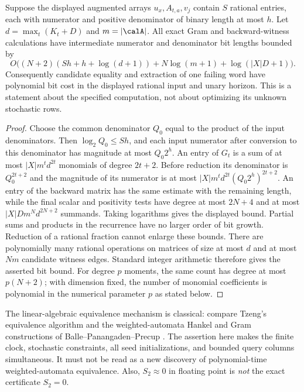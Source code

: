 \begin{lemma}\label{lem:grambits49}
Suppose the displayed augmented arrays $u_x,A_{t,a},v_j$ contain $S$
rational entries, each with numerator and positive denominator of
binary length at most $h$. Let $d=\max_t(K_t+D)$ and
$m=|\calA|$. All exact Gram and backward-witness calculations have
intermediate numerator and denominator bit lengths bounded by
\[
 O\bigl((N+2)(Sh+h+\log(d+1))+N\log(m+1)
           +\log(|X|D+1)\bigr).
\]
Consequently candidate equality and extraction of one failing word
have polynomial bit cost in the displayed rational input and unary
horizon. This is a statement about the specified computation, not
about optimizing its unknown stochastic rows.
\end{lemma}
\begin{proof}
Choose the common denominator $Q_0$ equal to the product of the input
denominators. Then $\log_2 Q_0\le Sh$, and each input numerator after
conversion to this denominator has magnitude at most $Q_0 2^h$.
An entry of $G_t$ is a sum of at most $|X|m^t d^{2t}$ monomials of
degree $2t+2$. Before reduction its denominator is $Q_0^{2t+2}$
and the magnitude of its numerator is at most
$|X|m^t d^{2t}(Q_0 2^h)^{2t+2}$.
An entry of the backward matrix has the same estimate with the
remaining length, while the final scalar and positivity tests have
degree at most $2N+4$ and at most $|X|Dm^N d^{2N+2}$ summands.
Taking logarithms gives the displayed bound. Partial sums and
products in the recurrence have no larger order of bit growth.
Reduction of a rational fraction cannot enlarge these bounds.
There are polynomially many rational operations on matrices of
size at most $d$ and at most $Nm$ candidate witness edges. Standard
integer arithmetic therefore gives the asserted bit bound.
For degree $p$ moments, the same count has degree at most $p(N+2)$;
with dimension fixed, the number of monomial coefficients is
polynomial in the numerical parameter $p$ as stated below.
\end{proof}

The linear-algebraic equivalence mechanism is classical: compare
Tzeng's equivalence algorithm \cite{Tzeng92} and the weighted-automata
Hankel and Gram constructions of Balle--Panangaden--Precup
\cite{BPP15}. The assertion here makes the finite clock, stochastic
constraints, all seed initializations, and bounded query columns
simultaneous. It must not be read as a new discovery of polynomial-time
weighted-automata equivalence. Also, $S_2\approx0$ in floating point is
\emph{not} the exact certificate $S_2=0$.

